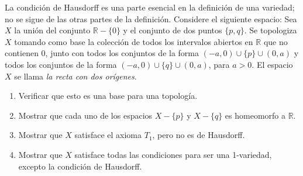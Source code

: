 
\item La condición de Hausdorff es una parte esencial en la definición de una variedad; no se sigue de las otras partes de la definición. Considere el siguiente espacio:  
    Sea \( X \) la unión del conjunto \( \mathbb{R} - \{ 0 \} \) y el conjunto de dos puntos \( \{ p, q \} \). Se topologiza \( X \) tomando como base la colección de todos los intervalos abiertos en \( \mathbb{R} \) que no contienen \( 0 \), junto con todos los conjuntos de la forma \( (-a,0) \cup \{ p \} \cup (0,a) \) y todos los conjuntos de la forma \( (-a,0) \cup \{ q \} \cup (0,a) \), para \( a > 0 \). El espacio \( X \) se llama \textit{la recta con dos orígenes}.
    
    \begin{enumerate}
        \item Verificar que esto es una base para una topología.
        \item Mostrar que cada uno de los espacios \( X - \{ p \} \) y \( X - \{ q \} \) es homeomorfo a \( \mathbb{R} \).
        \item Mostrar que \( X \) satisface el axioma \( T_1 \), pero no es de Hausdorff.
        \item Mostrar que \( X \) satisface todas las condiciones para ser una 1-variedad, excepto la condición de Hausdorff.
    \end{enumerate}